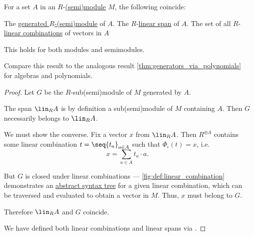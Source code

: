 \begin{proposition}\label{thm:generated_submodule}
  For a set \( A \) in an \( R \)-\hyperref[def:semimodule]{(semi)module} \( M \), the following coincide:
  \begin{thmenum}
     The \hyperref[def:semimodule/generated]{generated \( R \)-(semi)module} of \( A \).
     The \( R \)-\hyperref[def:linear_span]{linear span} of \( A \).
     The set of all \( R \)-\hyperref[def:linear_combination]{linear combinations} of vectors in \( A \)
  \end{thmenum}
\end{proposition}
\begin{comments}
  \item This holds for both modules and semimodules.
  \item Compare this result to the analogous result \cref{thm:generators_via_polynomials} for algebras and polynomials.
\end{comments}
\begin{proof}
   Let \( G \) be the \( R \)-sub(semi)module of \( M \) generated by \( A \).

  The span \( \lin_R A \) is by definition a sub(semi)module of \( M \) containing \( A \). Then \( G \) necessarily belongs to \( \lin_R A \).

  We must show the converse. Fix a vector \( x \) from \( \lin_R A \). Then \( R^{\oplus A} \) contains some linear combination \( t = \seq{ t_a }_{a \in A} \) such that \( \Phi_\iota(t) = x \), i.e.
  \begin{equation*}
    x = \sum_{a \in A} t_a \cdot a.
  \end{equation*}

  But \( G \) is closed under linear combinations --- \cref{fig:def:linear_combination} demonstrates an \hyperref[con:abstract_syntax_tree]{abstract syntax tree} for a given linear combination, which can be traversed and evaluated to obtain a vector in \( M \). Thus, \( x \) must belong to \( G \).

  Therefore \( \lin_R A \) and \( G \) coincide.

   We have defined both linear combinations and linear spans via .
\end{proof}

